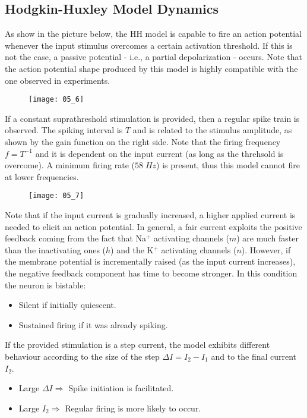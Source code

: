 \subsection{Hodgkin-Huxley Model Dynamics}
As show in the picture below, the HH model is capable to fire an action potential
whenever the input stimulus overcomes a certain activation threshold. If this is not
the case, a passive potential - i.e., a partial depolarization - occurs. Note that
the action potential shape produced by this model is highly compatible with the one
observed in experiments.
\begin{figure}[H]
    \texttt{[image: 05\_6]}
    \centering
\end{figure}
If a constant suprathreshold stimulation is provided, then a regular spike train is
observed. The spiking interval is \(T\) and is related to the stimulus amplitude, as
shown by the gain function on the right side. Note that the firing frequency \(f=T^{-1}\)
and it is dependent on the input current (as long as the threhsold is overcome). A minimum
firing rate (\(58\;Hz\)) is present, thus this model cannot fire at lower frequencies.
\begin{figure}[H]
    \texttt{[image: 05\_7]}
    \centering
\end{figure}
Note that if the input current is gradually increased, a higher applied current is needed
to elicit an action potential. In general, a fair current exploits the positive feedback
coming from the fact that Na\({}^{+}\) activating channels (\(m\)) are much faster than the
inactivating ones (\(h\)) and the K\({}^{+}\) activating channels (\(n\)). However, if the
membrane potential is incrementally raised (as the input current increases), the negative
feedback component has time to become stronger. In this condition the neuron is bistable:
\begin{itemize}
    \item Silent if initially quiescent.
    \item Sustained firing if it was already spiking.
\end{itemize}
If the provided stimulation is a step current, the model exhibits different behaviour
according to the size of the step \(\Delta{I}=I_{2}-I_{1}\) and to the final current \(I_{2}\).
\begin{itemize}
    \item Large \(\Delta{I}\Rightarrow\) Spike initiation is facilitated.
    \item Large \(I_{2}\Rightarrow\) Regular firing is more likely to occur.
\end{itemize}
